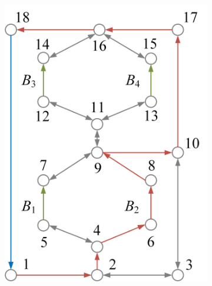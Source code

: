 \documentclass{article}
\begin{document}
\begin{figure}[htbp]
\begin{subfigure}[b]{0.45\textwidth}
        \includegraphics[width=\textwidth]{../attachments/ef-sp2.png}
        \caption{}
        \label{fig:sp2}
    \end{subfigure}
    \\
    \begin{subfigure}[b]{0.45\textwidth}

\end{subfigure}
\end{figure}
\end{document}

